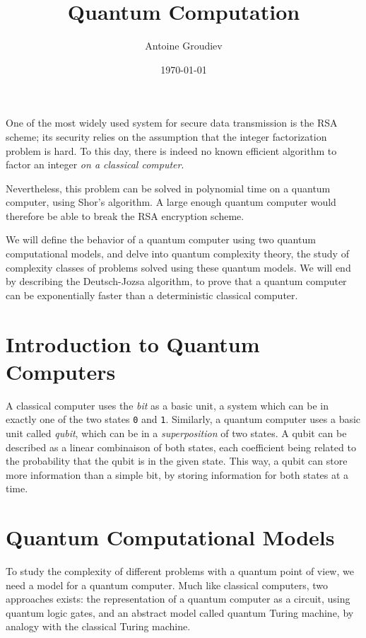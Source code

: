 \documentclass[12pt,a4paper]{article}
\title{\vspace{-3ex} \textbf{Quantum Computation}}
\author{Antoine Groudiev}
\date{\vspace{-1ex}\today}
\begin{document}
\maketitle
One of the most widely used system for secure data transmission is the RSA scheme; its security relies on the assumption that the integer factorization problem is hard. To this day, there is indeed no known efficient algorithm to factor an integer \textit{on a classical computer}.

Nevertheless, this problem can be solved in polynomial time on a quantum computer, using Shor's algorithm. A large enough quantum computer would therefore be able to break the RSA encryption scheme.

We will define the behavior of a quantum computer using two quantum computational models, and delve into quantum complexity theory, the study of complexity classes of problems solved using these quantum models. We will end by describing the Deutsch-Jozsa algorithm, to prove that a quantum computer can be exponentially faster than a deterministic classical computer.

\tableofcontents

\section*{Introduction to Quantum Computers}
A classical computer uses the \emph{bit} as a basic unit, a system which can be in exactly one of the two states \texttt{0} and \texttt{1}. Similarly, a quantum computer uses a basic unit called \emph{qubit}, which can be in a \emph{superposition} of two states. A qubit can be described as a linear combinaison of both states, each coefficient being related to the probability that the qubit is in the given state. This way, a qubit can store more information than a simple bit, by storing information for both states at a time.

\section{Quantum Computational Models}
To study the complexity of different problems with a quantum point of view, we need a model for a quantum computer. Much like classical computers, two approaches exists: the representation of a quantum computer as a circuit, using quantum logic gates, and an abstract model called quantum Turing machine, by analogy with the classical Turing machine.
\end{document}
